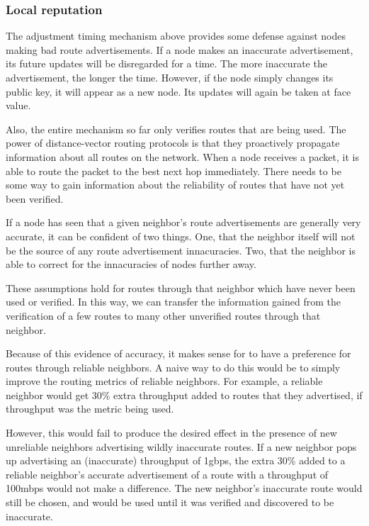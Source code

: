 \documentclass[11pt]{article}
\begin{document}
\subsubsection{Local reputation}

The adjustment timing mechanism above provides some defense against nodes making bad route advertisements. If a node makes an inaccurate advertisement, its future updates will be disregarded for a time. The more inaccurate the advertisement, the longer the time. However, if the node simply changes its public key, it will appear as a new node. Its updates will again be taken at face value.

Also, the entire mechanism so far only verifies routes that are being used. The power of distance-vector routing protocols is that they proactively propagate information about all routes on the network. When a node receives a packet, it is able to route the packet to the best next hop immediately. There needs to be some way to gain information about the reliability of routes that have not yet been verified.

If a node has seen that a given neighbor's route advertisements are generally very accurate, it can be confident of two things. One, that the neighbor itself will not be the source of any route advertisement innacuracies. Two, that the neighbor is able to correct for the innacuracies of nodes further away.

These assumptions hold for routes through that neighbor which have never been used or verified. In this way, we can transfer the information gained from the verification of a few routes to many other unverified routes through that neighbor.

Because of this evidence of accuracy, it makes sense for to have a preference for routes through reliable neighbors. A naive way to do this would be to simply improve the routing metrics of reliable neighbors. For example, a reliable neighbor would get 30\% extra throughput added to routes that they advertised, if throughput was the metric being used.

However, this would fail to produce the desired effect in the presence of new unreliable neighbors advertising wildly inaccurate routes. If a new neighbor pops up advertising an (inaccurate) throughput of 1gbps, the extra 30\% added to a reliable neighbor's accurate advertisement of a route with a throughput of 100mbps would not make a difference. The new neighbor's inaccurate route would still be chosen, and would be used until it was verified and discovered to be inaccurate.
\end{document}
